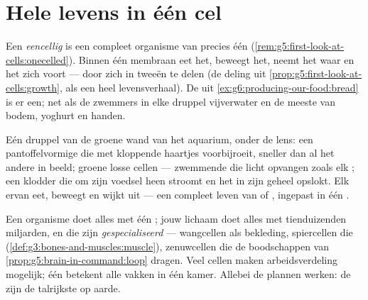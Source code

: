 \section{Hele levens in één cel}

\begin{definition}\label{def:g6:cell-unit-of-life:unicellular}
Een \emph{eencellig}  is een compleet
organisme van precies één 
(\cref{rem:g5:first-look-at-cells:onecelled}). Binnen één membraan eet
het, beweegt het, neemt het waar en  het zich voort --- door zich in
tweeën te delen (de deling uit
\cref{prop:g5:first-look-at-cells:growth}, als een heel levensverhaal).
De  uit \cref{ex:g6:producing-our-food:bread} is er een; net als de
zwemmers in elke druppel vijverwater en de meeste  van bodem,
yoghurt en handen.
\end{definition}

\begin{example}\label{ex:g6:cell-unit-of-life:drop}
Eén druppel van de groene wand van het aquarium, onder de lens: een
pantoffelvormige  die met kloppende haartjes voorbijroeit, sneller dan
al het andere in beeld; groene losse cellen --- zwemmende  die
licht opvangen zoals elk ; een klodder die om zijn voedsel heen
stroomt en het in zijn geheel opslokt. Elk ervan eet, beweegt en wijkt
uit --- een compleet leven van  of , ingepast in één .
\end{example}

\begin{remark}\label{rem:g6:cell-unit-of-life:twoways}
Een  organisme doet alles met één ; jouw lichaam doet alles
met tienduizenden miljarden, en die zijn \emph{gespecialiseerd} ---
wangcellen als bekleding, spiercellen die 
(\cref{def:g3:bones-and-muscles:muscle}), zenuwcellen die de boodschappen
van \cref{prop:g5:brain-in-command:loop} dragen. Veel cellen maken
arbeidsverdeling mogelijk; één  betekent alle vakken in één kamer.
Allebei de plannen werken: de  zijn de talrijkste  op aarde.
\end{remark}

